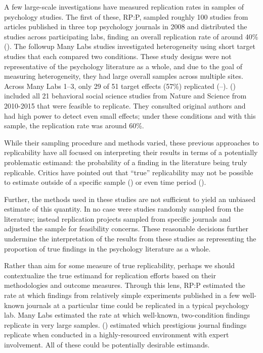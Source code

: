\documentclass[
  english,
  a4paper,
]{article}
\begin{document}
A few large-scale investigations have measured replication rates in samples of psychology studies. The first of these, RP:P, sampled roughly 100 studies from articles published in three top psychology journals in 2008 and distributed the studies across participating labs, finding an overall replication rate of around 40\% (). The followup Many Labs studies investigated heterogeneity using short target studies that each compared two conditions. These study designs were not representative of the psychology literature as a whole, and due to the goal of measuring heterogeneity, they had large overall samples across multiple sites. Across Many Labs 1--3, only 29 of 51 target effects (57\%) replicated (--). () included all 21 behavioral social science studies from Nature and Science from 2010-2015 that were feasible to replicate. They consulted original authors and had high power to detect even small effects; under these conditions and with this sample, the replication rate was around 60\%.

While their sampling procedure and methods varied, these previous approaches to replicability have all focused on interpreting their results in terms of a potentially problematic estimand: the probability of a finding in the literature being truly replicable. Critics have pointed out that ``true'' replicability may not be possible to estimate outside of a specific sample () or even time period ().

Further, the methods used in these studies are not sufficient to yield an unbiased estimate of this quantity. In no case were studies randomly sampled from the literature; instead replication projects sampled from specific journals and adjusted the sample for feasibility concerns. These reasonable decisions further undermine the interpretation of the results from these studies as representing the proportion of true findings in the psychology literature as a whole.

Rather than aim for some measure of true replicability, perhaps we should contextualize the true estimand for replication efforts based on their methodologies and outcome measures. Through this lens, RP:P estimated the rate at which findings from relatively simple experiments published in a few well-known journals at a particular time could be replicated in a typical psychology lab. Many Labs estimated the rate at which well-known, two-condition findings replicate in very large samples. () estimated which prestigious journal findings replicate when conducted in a highly-resourced environment with expert involvement. All of these could be potentially desirable estimands.
\end{document}

